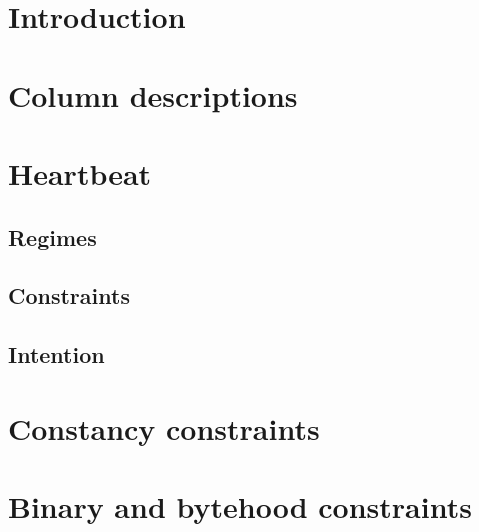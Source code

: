 \section{Introduction}                                                                                                                                                
\section{Column descriptions}                                                    \label{alu: mul: columns}                                                            
\section{Heartbeat}                                                                                
\subsection{Regimes}                                                                                                                                                  
\subsection{Constraints}                                                                                                                                              
\subsection{Intention}                                                                                                                                                
\section{Constancy constraints}                                                  \label{alu: mul: constancies}                                                        
\section{Binary and bytehood constraints}                                        \label{alu: mul: bits and bytes}                                                     
